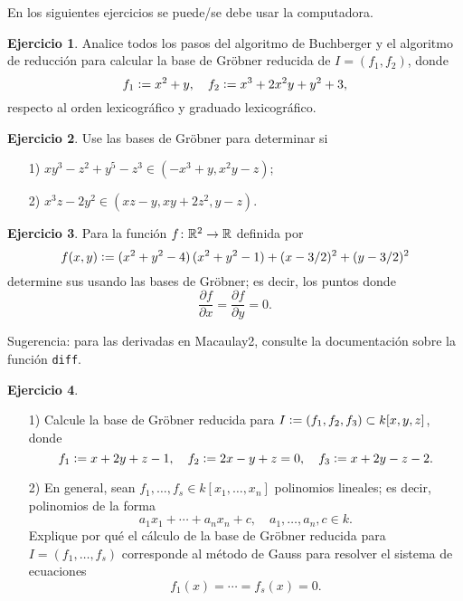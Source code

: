\documentclass{article}
\theoremstyle{definition}
\newtheorem{ejerc}{Ejercicio}
\begin{document}
\pagebreak

En los siguientes ejercicios se puede/se debe usar la computadora.

\begin{ejerc}
  Analice todos los pasos del algoritmo de Buchberger y el algoritmo de
  reducción para calcular la base de Gröbner reducida de $I = (f_1,f_2)$, donde
  $$f_1 \mathrel{\mathop:}= x^2 + y, \quad f_2 \mathrel{\mathop:}= x^3 + 2 x^2 y + y^2 + 3,$$
  respecto al orden lexicográfico y graduado lexicográfico.
\end{ejerc}

\begin{ejerc}
  Use las bases de Gröbner para determinar si

  \begin{enumerate}
  \item[1)] $xy^3 - z^2 + y^5 - z^3 \in (-x^3 + y, x^2 y - z)$;
  \item[2)] $x^3z - 2y^2 \in (xz - y, xy + 2z^2, y - z)$.
  \end{enumerate}
\end{ejerc}

\begin{ejerc}
  Para la función $f\colon \mathbb{R}^2 \to \mathbb{R}$ definida por
  $$f (x, y) \mathrel{\mathop:}= (x^2 + y^2 - 4)\,(x^2 + y^2 - 1) + (x - 3/2)^2 + (y - 3/2)^2$$
  determine sus  usando las bases de Gröbner; es decir,
  los puntos donde
  $$\frac{\partial f}{\partial x} = \frac{\partial f}{\partial y} = 0.$$

  \noindent Sugerencia: para las derivadas en Macaulay2, consulte la documentación sobre la función \verb|diff|.
\end{ejerc}

\begin{ejerc}
  ~

  \begin{enumerate}
  \item[1)] Calcule la base de Gröbner reducida para
    $I \mathrel{\mathop:}= (f_1,f_2,f_3) \subset k [x,y,z]$, donde
    \[ f_1 \mathrel{\mathop:}= x+2y+z-1, \quad
       f_2 \mathrel{\mathop:}= 2x-y+z = 0, \quad
       f_3 \mathrel{\mathop:}= x + 2y - z - 2. \]

  \item[2)] En general, sean $f_1, \ldots, f_s \in k [x_1,\ldots,x_n]$
    polinomios lineales; es decir, polinomios de la forma
    $$a_1 x_1 + \cdots + a_n x_n + c, \quad a_1,\ldots,a_n, c\in k.$$
    Explique por qué el cálculo de la base de Gröbner reducida para
    $I = (f_1,\ldots,f_s)$ corresponde al método de Gauss para resolver el
    sistema de ecuaciones
    $$f_1 (x) = \cdots = f_s (x) = 0.$$
  \end{enumerate}
\end{ejerc}
\end{document}
